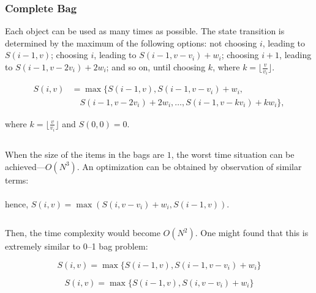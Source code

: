 \documentclass{article}
\begin{document}
\subsubsection{Complete Bag}

Each object can be used as many times as possible. The state transition is determined by the maximum of the following options: not choosing $i$, leading to $S(i-1,v)$; choosing $i$, leading to $S(i-1,v-v_i)+w_i$; choosing $i+1$, leading to $S(i-1,v-2v_i)+2w_i$; and so on, until choosing $k$, where $k=\lfloor \frac{v}{v_i} \rfloor$.

\[
	\begin{split}
		S(i,v) &= \max \{ S(i-1,v), S(i-1,v-v_i)+w_i, \\
		&\quad S(i-1,v-2v_i)+2w_i, \ldots, S(i-1,v-kv_i)+kw_i \},
	\end{split}
\]

where $k = \lfloor \frac{v}{v_i} \rfloor$ and $S(0, 0) = 0$.

\begin{center}
	\inputminted{cpp}{src/struct-rudimentary-complete.cpp}
\end{center}

When the size of the items in the bags are $1$, the worst time situation can be achieved---$O(N^3)$. An optimization can be obtained by observation of similar terms:\\[0.5em]
\begingroup
\centering
{}
\endgroup\\[0.5em]
hence, $S(i, v) = \max (S(i, v - v_i) + w_i, S(i - 1, v))$.

\begin{center}
	\inputminted[firstline=22, lastline=26]{cpp}{src/struct-complete-bag.cpp}
\end{center}

Then, the time complexity would become $O(N^2)$. One might found that this is extremely similar to 0--1 bag problem:

\begin{multicols}{2}
	\noindent
	\[
		S(i, v) = \max \{S(i - 1, v), S(i - 1, v - v_i) + w_i\}
	\]

	\columnbreak
	\noindent
	\[
		S(i, v) = \max \{S(i - 1, v), S(i, v - v_i) + w_i \}
	\]
\end{multicols}
\end{document}
